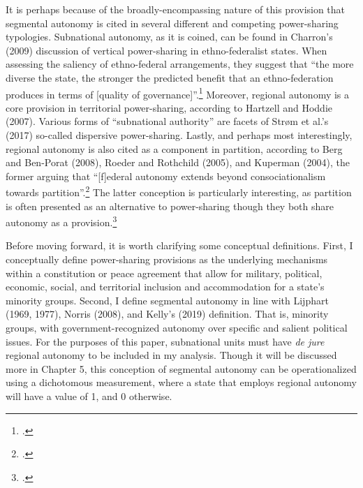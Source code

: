\documentclass[12pt]{article}
\begin{document}
It is perhaps because of the broadly-encompassing nature of this provision that segmental autonomy is cited in several different and competing power-sharing typologies. Subnational autonomy, as it is coined, can be found in Charron’s (2009) discussion of vertical power-sharing in ethno-federalist states. When assessing the saliency of ethno-federal arrangements, they suggest that ``the more diverse the state, the stronger the predicted benefit that an ethno-federation produces in terms of [quality of governance]''.\footcite[600]{charron_government_2009} Moreover, regional autonomy is a core provision in territorial power-sharing, according to Hartzell and Hoddie (2007). Various forms of ``subnational authority'' are facets of Strøm et al.’s (2017) so-called dispersive power-sharing. Lastly, and perhaps most interestingly, regional autonomy is also cited as a component in partition, according to Berg and Ben-Porat (2008), Roeder and Rothchild (2005), and Kuperman (2004), the former arguing that ``[f]ederal autonomy extends beyond consociationalism towards partition''.\footcite[33]{berg_introduction:_2008} The latter conception is particularly interesting, as partition is often presented as an alternative to power-sharing though they both share autonomy as a provision.\footcite{berg_introduction:_2008, roeder_sustainable_2003}

Before moving forward, it is worth clarifying some conceptual definitions. First, I conceptually define power-sharing provisions as the underlying mechanisms within a constitution or peace agreement that allow for military, political, economic, social, and territorial inclusion and accommodation for a state's minority groups. Second, I define segmental autonomy in line with Lijphart (1969, 1977), Norris (2008), and Kelly’s (2019) definition. That is, minority groups, with government-recognized autonomy over specific and salient political issues. For the purposes of this paper, subnational units must have \textit{de jure} regional autonomy to be included in my analysis. Though it will be discussed more in Chapter 5, this conception of segmental autonomy can be operationalized using a dichotomous measurement, where a state that employs regional autonomy will have a value of 1, and 0 otherwise. 
\end{document}
